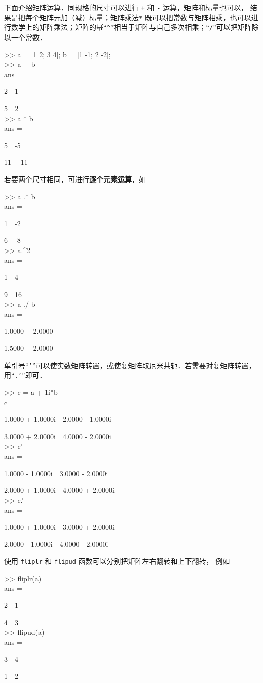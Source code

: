 下面介绍矩阵运算．同规格的尺寸可以进行 \texttt{+} 和 \texttt{-} 运算，矩阵和标量也可以， 结果是把每个矩阵元加（减）标量；矩阵乘法\texttt{*} 既可以把常数与矩阵相乘，也可以进行数学上的矩阵乘法；矩阵的幂“\texttt{\^{}}”相当于矩阵与自己多次相乘；“\texttt{/}”可以把矩阵除以一个常数．
\begin{Command}
>> a = [1 2; 3 4]; b = [1 -1; 2 -2]; \\
>> a + b \\
ans = \par
2\ \ 1 \par
5\ \ 2\\
>> a * b \\
ans = \par
5\ \ -5 \par
11\ \ -11
\end{Command}
若要两个尺寸相同，可进行\textbf{逐个元素运算}，如
\begin{Command}
>> a .* b \\
ans = \par
1\ \ -2 \par
6\ \ -8\\
>> a.\^{}2 \\
ans = \par
1\ \ 4 \par
9\ \ 16 \\
>> a ./ b \\
ans = \par
1.0000\ \ -2.0000 \par
1.5000\ \ -2.0000
\end{Command}
单引号“\texttt{'}”可以使实数矩阵转置，或使复矩阵取厄米共轭．若需要对复矩阵转置，用“\texttt{.'}”即可．
\begin{Command}
>> c = a + 1i*b \\
c = \par
1.0000 + 1.0000i\ \ 2.0000 - 1.0000i \par
3.0000 + 2.0000i\ \ 4.0000 - 2.0000i \\
>> c' \\
ans = \par
1.0000 - 1.0000i\ \ 3.0000 - 2.0000i \par
2.0000 + 1.0000i\ \ 4.0000 + 2.0000i \\
>> c.' \\
ans = \par
1.0000 + 1.0000i\ \ 3.0000 + 2.0000i \par
2.0000 - 1.0000i\ \ 4.0000 - 2.0000i
\end{Command}
使用 \texttt{fliplr} 和 \texttt{flipud} 函数可以分别把矩阵左右翻转和上下翻转， 例如
\begin{Command}
>> fliplr(a)\\
ans = \par
2\ \ 1\par
4\ \ 3\\
>> flipud(a)\\
ans = \par
3\ \ 4\par
1\ \ 2
\end{Command}

